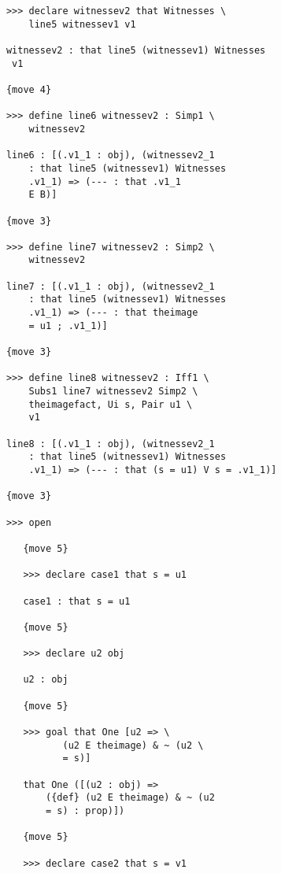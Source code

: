 \documentclass[12pt]{article}
\begin{document}
\begin{verbatim}
            >>> declare witnessev2 that Witnesses \
                line5 witnessev1 v1

            witnessev2 : that line5 (witnessev1) Witnesses 
             v1

            {move 4}

            >>> define line6 witnessev2 : Simp1 \
                witnessev2

            line6 : [(.v1_1 : obj), (witnessev2_1 
                : that line5 (witnessev1) Witnesses 
                .v1_1) => (--- : that .v1_1 
                E B)]

            {move 3}

            >>> define line7 witnessev2 : Simp2 \
                witnessev2

            line7 : [(.v1_1 : obj), (witnessev2_1 
                : that line5 (witnessev1) Witnesses 
                .v1_1) => (--- : that theimage 
                = u1 ; .v1_1)]

            {move 3}

            >>> define line8 witnessev2 : Iff1 \
                Subs1 line7 witnessev2 Simp2 \
                theimagefact, Ui s, Pair u1 \
                v1

            line8 : [(.v1_1 : obj), (witnessev2_1 
                : that line5 (witnessev1) Witnesses 
                .v1_1) => (--- : that (s = u1) V s = .v1_1)]

            {move 3}

            >>> open

               {move 5}

               >>> declare case1 that s = u1

               case1 : that s = u1

               {move 5}

               >>> declare u2 obj

               u2 : obj

               {move 5}

               >>> goal that One [u2 => \
                      (u2 E theimage) & ~ (u2 \
                      = s)]

               that One ([(u2 : obj) => 
                   ({def} (u2 E theimage) & ~ (u2 
                   = s) : prop)])

               {move 5}

               >>> declare case2 that s = v1


\end{verbatim}
\end{document}
